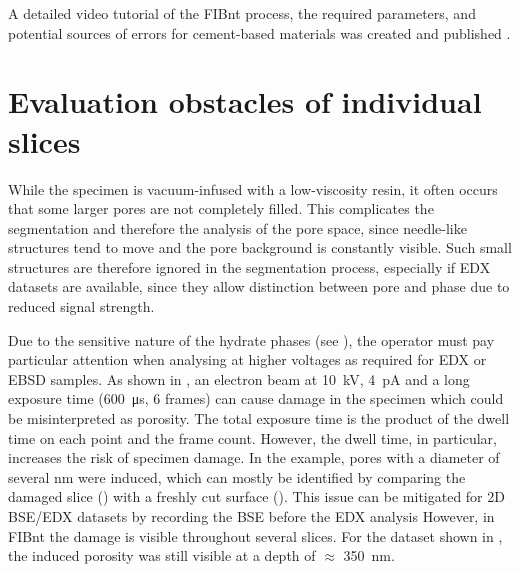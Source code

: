 A detailed video tutorial of the \ac{FIBnt} process, the required parameters, and potential sources of errors for cement-based materials was created and published \cite{kleiner.2025b}.

\section{Evaluation obstacles of individual slices}
\label{sec:fib_evaluation_obstacles}

While the specimen is vacuum-infused with a low-viscosity resin, it often occurs that some larger pores are not completely filled.
This complicates the segmentation and therefore the analysis of the pore space, since needle-like structures tend to move and the pore background is constantly visible.
Such small structures are therefore ignored in the segmentation process, especially if \ac{EDX} datasets are available, since they allow distinction between pore and phase due to reduced signal strength.

Due to the sensitive nature of the hydrate phases (see ), the operator must pay particular attention when analysing at higher voltages as required for \ac{EDX} or \ac{EBSD} samples.
As shown in , an electron beam at \qty{10}{\kilo\volt}, \qty{4}{\pico\ampere} and a long exposure time (\qty{600}{\micro\second}, \num{6} frames) can cause damage in the specimen which could be misinterpreted as porosity.
The total exposure time is the product of the dwell time on each point and the frame count.
However, the dwell time, in particular, increases the risk of specimen damage.
In the example, pores with a diameter of several \unit{\nano\meter} were induced, which can mostly be identified by comparing the damaged slice () with a freshly cut surface ().
This issue can be mitigated for 2D \ac{BSE}/\ac{EDX} datasets by recording the \ac{BSE} before the \ac{EDX} analysis
However, in \ac{FIBnt} the damage is visible throughout several slices.
For the dataset shown in , the induced porosity was still visible at a depth of $\approx$ \qty{350}{\nano\meter}.

